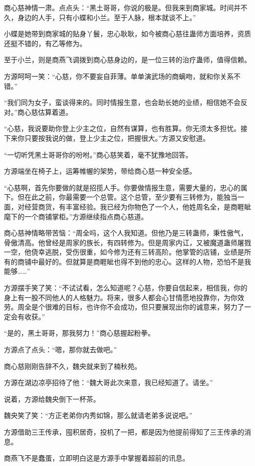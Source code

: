 \begin{this_body}
商心慈神情一肃。点点头：“黑土哥哥，你说的极是。但我来到商家城。时间并不久，身边的人手，只有小蝶和小兰。至于人脉，根本就谈不上。”

小蝶是她带到商家城的贴身丫鬟，忠心耿耿，如今被商心慈往蛊师方面培养，资质还挺不错的，有乙等修为。

至于小兰，则是商燕飞调拨到商心慈身边的，是一位三转的治疗蛊师，值得信赖。

方源呵呵一笑：“心慈，你不要妄自菲薄。单单演武场的商螭吻，就和你关系不错。”

“我们同为女子，蛮谈得来的。同时情报生意，也会助长她的业绩，相信她不会反对。”商心慈估算着道。

“心慈，我说要助你登上少主之位，自然有谋算，也有胜算。你无须太多担忧。接下来你只要按我说的做，登上少主之位，把握很大。”方源又安慰道。

“一切听凭黑土哥哥你的吩咐。”商心慈笑着，毫不犹豫地回答。

方源端坐在椅子上，运筹帷幄的架势，带给商心慈一种安全感。

“心慈啊，首先你要做的就是招揽人手。你要做情报生意，需要大量的，忠心的属下。但在此之前，你最需要一个总管。这个总管，至少要有三转修为，能独当一面，对经营商货，有丰富经验。我已经为你物色了一个人，他姓周名全，是商睚眦麾下的一个商铺掌柜。”方源继续指点商心慈道。

商心慈神情略带苦恼：“周全吗，这个人我知道。但他乃是三转蛊师，秉性傲气，骨傲清高。他曾经是周家的族长，有四转修为。但是周家内讧，又被魔道蛊师屠戮一空，他侥幸逃脱，受伤很重，如今修为还有三转高阶。他掌管的店铺，业绩是所有的商铺中最好的。但就算是商睚眦也得不到他的忠心。这样的人物，恐怕不是我能够……”

方源摆手笑了笑：“不试试看，怎么知道呢？心慈，你要自信起来，相信我，你的身上有一股不同他人的人格魅力。将来，很多人都会心甘情愿地投靠你，为你效劳。周全是个很难的目标，也许你不会成功，但只要展现出你的诚意来，努力了一定会有收获。”

“是的，黑土哥哥，那我努力！”商心慈握起粉拳。

方源点了点头：“嗯，那你就去做吧。”

商心慈刚刚告辞不久，魏央就来到了楠秋苑。

方源在湖边凉亭招待了他：“魏大哥此次来意，我已经知道了。请坐。”

说着，方源给魏央倒下一杯茶。

魏央笑了笑：“方正老弟你内秀如锦，那么就请老弟多说说吧。”

方源借助三王传承，囤积居奇，投机了一把，都是因为他提前得知了三王传承的消息。

商燕飞不是蠢蛋，立即明白这是方源手中掌握着超前的讯息。


\end{this_body}
